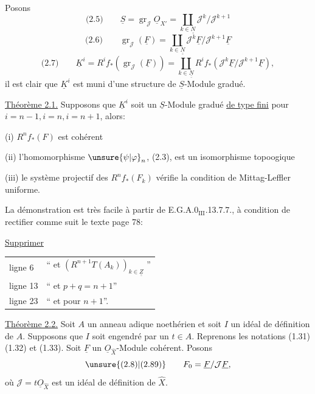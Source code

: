 Posons
\[
\text{(2.5)}\qquad\underline S=\operatorname{gr}_{\mathcal J}\underline O_{X'}
=\coprod_{k\in\underline{\underline N}}\mathcal J^k/\mathcal J^{k+1}
\]
\[
\text{(2.6)}\qquad\operatorname{gr}_{\mathcal J}(\underline F)
=\coprod_{k\in\underline{\underline N}}\mathcal J^k\underline F/\mathcal J^{k+1}\underline F
\]
\[
\text{(2.7)}\qquad\underline K^i=R^if_*(\operatorname{gr}_{\mathcal J}(\underline F))
=\coprod_{k\in\underline{\underline N}}R^if_*(\mathcal J^k\underline F/\mathcal J^{k+1}\underline F),
\]
il est clair que $\underline K^i$ est muni d'une structure de $\underline S$-Module
gradué.

\uline{Théorème 2.1.} Supposons que $\underline K^i$ soit un $\underline S$-Module gradué
\uline{de type fini} pour $i=n-1,i=n,i=n+1$, alors:

(i) $R^nf_*(F)$ est cohérent

(ii) l'homomorphisme $\unsure{\psi|\varphi}_n$, (2.3), est un isomorphisme
topoogique

(iii) le système projectif des $R^nf_*(F_k)$ vérifie
la condition de Mittag-Leffler uniforme.

La démonstration est très facile à partir de
E.G.A.$0_{\mathrm{III}}$.13.7.7., à condition de rectifier comme suit
le texte page 78:

\uline{Supprimer}

\begin{tabular}{ll}
ligne 6 & `` et $(R^{n+1}T(A_k))_{k\in\underline{\underline Z}}$ ''\\[1ex]
ligne 13 & `` et $p+q=n+1$''\\[1ex]
ligne 23 & `` et pour $n+1$''.
\end{tabular}

\uline{Théorème 2.2.} Soit $A$ un anneau adique noethérien et soit
$I$ un idéal de définition de $A$.
Supposons que $I$ soit engendré par un $t\in A$. Reprenons les notations (1.31)\inserted{,}(1.32) et
(1.33). Soit $\underline F$ un $\underline O_{\widehat X}$-Module cohérent. Posons
\[
\text{\unsure{(2.8)|(2.89)}}\qquad F_0=\underline F/\mathcal J\underline F,
\]
où $\mathcal J=t\underline O_{\widehat X}$ est un idéal de définition de $\widehat X$.

